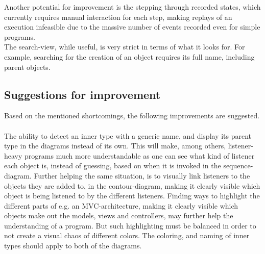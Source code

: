 Another potential for improvement is the stepping through recorded states, which currently requires manual interaction for each step, making replays of an execution infeasible due to the massive number of events recorded even for simple programs.
~\\

The search-view, while useful, is very strict in terms of what it looks for.
For example, searching for the creation of an object requires its full name, including parent objects.
~\\

\subsection{Suggestions for improvement}\label{jiveSuggestions}

Based on the mentioned shortcomings, the following improvements are suggested.
~\\

The ability to detect an inner type with a generic name, and display its parent type in the diagrams instead of its own.
This will make, among others, listener-heavy programs much more understandable as one can see what kind of listener each object is, instead of guessing, based on when it is invoked in the sequence-diagram.%
Further helping the same situation, is to visually link listeners to the objects they are added to, in the contour-diagram, making it clearly visible which object is being listened to by the different listeners.%
Finding ways to highlight the different parts of e.g. an MVC-architecture, making it clearly visible which objects make out the models, views and controllers, may further help the understanding of a program.
But such highlighting must be balanced in order to not create a visual chaos of different colors.
The coloring, and naming of inner types should apply to both of the diagrams.
~\\